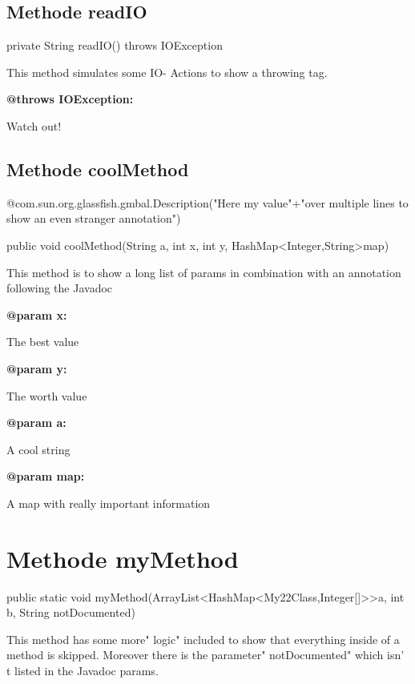 \documentclass[12pt]{scrreprt}
\begin{document}
\subsection{Methode readIO}
\label{examples.SimpleExample.My22Class:readIO}




private String readIO() throws IOException


This method simulates some IO- Actions to show a throwing tag.




\textbf{@throws IOException:}

\quad\quad Watch out!


\subsection{Methode coolMethod}
\label{examples.SimpleExample.My22Class:coolMethod}

@com.sun.org.glassfish.gmbal.Description("Here my value"+"over multiple lines to show an even stranger annotation")



public void coolMethod(String a, int x, int y, HashMap\textless Integer,String\textgreater  map)


This method is to show a long list of params in combination with an annotation following the Javadoc



\textbf{@param x:}

\quad\quad The best value

\textbf{@param y:}

\quad\quad The worth value

\textbf{@param a:}

\quad\quad A cool string

\textbf{@param map:}

\quad\quad A map with really important information



\section{Methode myMethod}
\label{examples.SimpleExample:myMethod}




public static void myMethod(ArrayList\textless HashMap\textless My22Class,Integer[]\textgreater \textgreater  a, int b, String notDocumented)


This method has some more" logic" included to show that everything inside of a method is skipped. Moreover there is the parameter" notDocumented" which isn' t listed in the Javadoc params.
\end{document}

